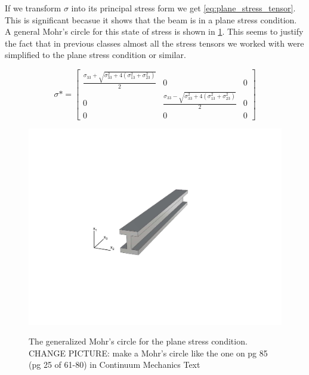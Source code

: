 If we transform $\sigma$ into its principal stress form we get \cref{eq:plane_stress_tensor}.
This is significant becasue it shows that the beam is in a plane stress condition. 
A general Mohr's circle for this state of stress is shown in \cref{fig:mohrs_circle}.
This seems to justify the fact that in previous classes almost all the stress tensors we worked with were simplified to the plane stress condition or similar. 

\begin{equation}
\sigma* = \begin{bmatrix}
 \frac{\sigma_{33} + \sqrt{\sigma_{33}^2 + 4(\sigma_{13}^2 + \sigma_{23}^2)}}{2} & 0 & 0 \\
0 &  \frac{\sigma_{33} - \sqrt{\sigma_{33}^2 + 4(\sigma_{13}^2 + \sigma_{23}^2)}}{2} & 0 \\
0 & 0 & 0
\end{bmatrix}
\label{eq:plane_stress_tensor}
\end{equation}

\begin{figure}
\centering
\includegraphics[width=0.95\columnwidth,trim=4cm 7cm 6cm 6.5cm, clip]{figs/straight.pdf}
\label{fig:mohrs_circle}
\caption{The generalized Mohr's circle for the plane stress condition. CHANGE PICTURE: make a Mohr's circle like the one on pg 85 (pg 25 of 61-80) in Continuum Mechanics Text}
\end{figure}

%
%

